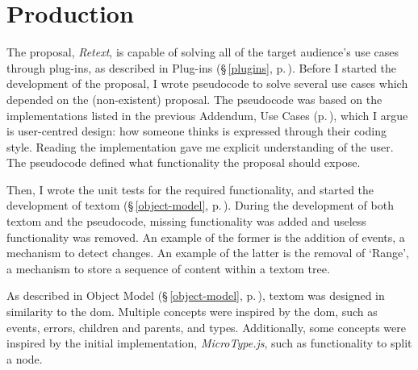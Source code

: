 
\begingroup
\let\clearpage\relax
\let\cleardoublepage\relax
\let\cleardoublepage\relax

\manualmark
{}

\chapter*{Production}\label{addendum-production}

The proposal, \emph{Retext}, is capable of solving all of the target
  audience's use cases through plug-ins, as described in Plug-ins
  (§\,\ref{plugins}, p.\,\pageref{plugins}).
Before I started the development of the proposal, I wrote pseudocode to
  solve several use cases which depended on the (non-existent) proposal.
The pseudocode was based on the implementations listed in the previous
  Addendum, Use Cases (p.\,\pageref{addendum-use-cases}), which I argue is
  user-centred design: how someone thinks is expressed through their coding
  style.
Reading the implementation gave me explicit understanding of the user.
The pseudocode defined what functionality the proposal should expose.

Then, I wrote the unit tests for the required functionality, and started
  the development of \gls{textom} (§\,\ref{object-model},
  p.\,\pageref{object-model}).
During the development of both \gls{textom} and the pseudocode, missing
  functionality was added and useless functionality was removed.
An example of the former is the addition of events, a mechanism to detect
  changes.
An example of the latter is the removal of `Range', a mechanism to store a
  sequence of content within a \gls{textom} tree.

As described in Object Model (§\,\ref{object-model},
  p.\,\pageref{object-model}), \gls{textom} was designed in similarity to the
  \gls{dom}.
Multiple concepts were inspired by the \gls{dom}, such as events, errors,
  children and parents, and types.
Additionally, some concepts were inspired by the initial implementation,
  \emph{MicroType.js}, such as functionality to split a node.

